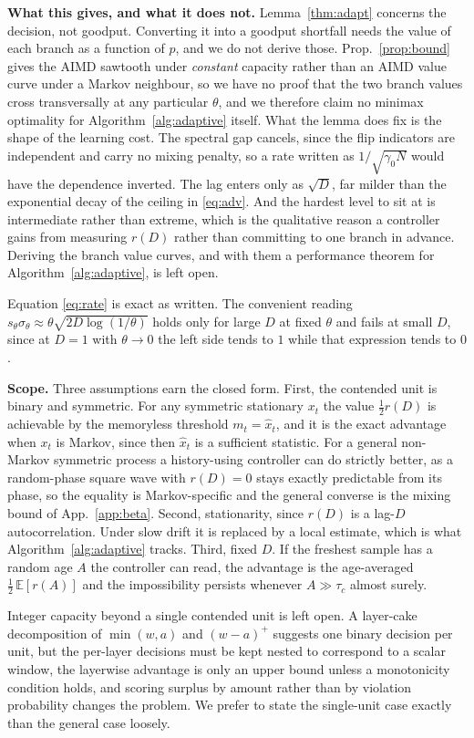 \noindent\textbf{What this gives, and what it does not.}
Lemma~\ref{thm:adapt} concerns the decision, not goodput. Converting it into a
goodput shortfall needs the value of each branch as a function of $p$, and we do
not derive those. Prop.~\ref{prop:bound} gives the AIMD sawtooth under
\emph{constant} capacity rather than an AIMD value curve under a Markov neighbour,
so we have no proof that the two branch values cross transversally at any
particular $\theta$, and we therefore claim no minimax optimality for
Algorithm~\ref{alg:adaptive} itself. What the lemma does fix is the shape of the
learning cost. The spectral gap cancels, since the flip indicators are independent
and carry no mixing penalty, so a rate written as $1/\sqrt{\gamma_0N}$ would have
the dependence inverted. The lag enters only as $\sqrt D$, far milder than the
exponential decay of the ceiling in \eqref{eq:adv}. And the hardest level to sit at
is intermediate rather than extreme, which is the qualitative reason a controller
gains from measuring $r(D)$ rather than committing to one branch in advance.
Deriving the branch value curves, and with them a performance theorem for
Algorithm~\ref{alg:adaptive}, is left open.

Equation \eqref{eq:rate} is exact as written. The convenient reading
$s_\theta\sigma_\theta\approx\theta\sqrt{2D\log(1/\theta)}$ holds only for large
$D$ at fixed $\theta$ and fails at small $D$, since at $D=1$ with $\theta\to0$ the
left side tends to $1$ while that expression tends to $0$.



\noindent\textbf{Scope.}
Three assumptions earn the closed form. First, the contended unit is binary and
symmetric. For any symmetric stationary $x_t$ the value $\tfrac12 r(D)$ is
achievable by the memoryless threshold $m_t=\hat x_t$, and it is the exact
advantage when $x_t$ is Markov, since then $\hat x_t$ is a sufficient statistic.
For a general non-Markov symmetric process a history-using controller can do
strictly better, as a random-phase square wave with $r(D){=}0$ stays exactly
predictable from its phase, so the equality is Markov-specific and the general
converse is the mixing bound of App.~\ref{app:beta}. Second, stationarity, since
$r(D)$ is a lag-$D$ autocorrelation. Under slow drift it is replaced by a local
estimate, which is what Algorithm~\ref{alg:adaptive} tracks. Third, fixed $D$. If
the freshest sample has a random age $A$ the controller can read, the advantage is
the age-averaged $\tfrac12\,\mathbb{E}[r(A)]$ and the impossibility persists
whenever $A\gg\tau_c$ almost surely.

Integer capacity beyond a single contended unit is left open. A layer-cake
decomposition of $\min(w,a)$ and $(w-a)^{+}$ suggests one binary decision per
unit, but the per-layer decisions must be kept nested to correspond to a scalar
window, the layerwise advantage is only an upper bound unless a monotonicity
condition holds, and scoring surplus by amount rather than by violation
probability changes the problem. We prefer to state the single-unit case exactly
than the general case loosely.
